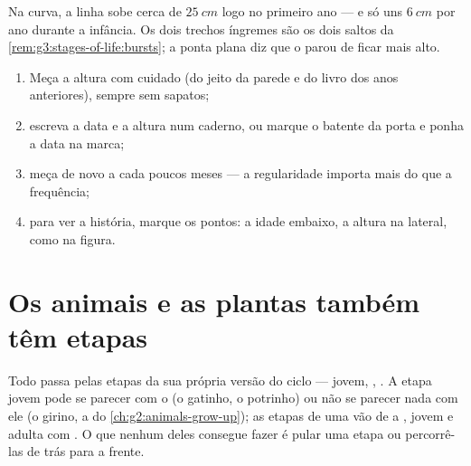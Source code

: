 \begin{example}\label{ex:g3:stages-of-life:reading}
Na curva, a linha sobe cerca de $\qty{25}{cm}$ logo no primeiro ano
--- e só uns $\qty{6}{cm}$ por ano durante a infância. Os dois
trechos íngremes são os dois saltos da
\cref{rem:g3:stages-of-life:bursts}; a ponta plana diz que o 
parou de ficar mais alto.
\end{example}

\begin{method}\label{met:g3:stages-of-life:keep}
\begin{enumerate}
  \item Meça a altura com cuidado (do jeito da parede e do livro
        dos anos anteriores), sempre sem sapatos;
  \item escreva a data e a altura num caderno, ou marque o batente
        da porta e ponha a data na marca;
  \item meça de novo a cada poucos meses --- a regularidade importa
        mais do que a frequência;
  \item para ver a história, marque os pontos: a idade embaixo, a
        altura na lateral, como na figura.
\end{enumerate}
\end{method}

\section{Os animais e as plantas também têm etapas}

\begin{proposition}\label{prop:g3:stages-of-life:animals}
Todo  passa pelas etapas da sua própria versão do ciclo ---
jovem, , . A etapa jovem pode se parecer com o 
(o gatinho, o potrinho) ou não se parecer nada com ele (o girino, a
 do \cref{ch:g2:animals-grow-up}); as etapas de uma 
vão de  a ,  jovem e adulta com . O que
nenhum deles consegue fazer é pular uma etapa ou percorrê-las de
trás para a frente.
\end{proposition}
\admitted

